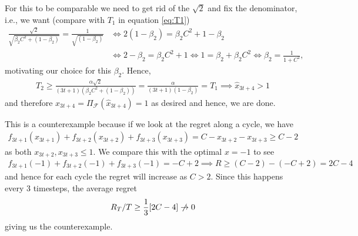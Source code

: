 \documentclass{article}
\newcommand{\1}{\mathbf{1}}                 %
\newcommand{\calF}{\mathcal{F}}
\newcommand{\pve}{\par\vspace{1cm}}
\begin{document}
For this to be comparable we need to get rid of the \(\sqrt{2}\) and fix the denominator, i.e., we want (compare with \(T_1\) in equation \eqref{eq:T1})
\begin{align}
\frac{\sqrt{2}}{\sqrt{\beta_2 C^2 + (1-\beta_2)}} = \frac{1}{\sqrt{(1-\beta_2)}} &\iff 2(1-\beta_2) = \beta_2 C^2 + 1 - \beta_2 \\ 
& \iff 2-\beta_2 = \beta_2 C^2 + 1 \iff 1 = \beta_2 + \beta_2 C^2 \iff \beta_2 = \frac{1}{1+C^2}, \label{eq:beta2}
\end{align}
motivating our choice for this \(\beta_2\). Hence, 
\begin{align*}
T_2 \geq \frac{\alpha\sqrt{2}}{(3t+1)(\beta_2 C^2 + (1-\beta_2))} = \frac{\alpha}{(3t+1)(1-\beta_2)} = T_1 \implies \hat{x}_{3t+4} > 1
\end{align*}
and therefore \(x_{3t+4}=\Pi_\calF(\hat{x}_{3t+4})=1\) as desired and hence, we are done. \pve 
This is a counterexample because if we look at the regret along a cycle, we have 
\begin{align*}
f_{3t+1}(x_{3t+1}) + f_{3t+2}(x_{3t+2}) + f_{3t+3}(x_{3t+3}) = C - x_{3t+2} - x_{3t+3} \geq C - 2
\end{align*}
as both \(x_{3t+2},x_{3t+3}\leq 1\). We compare this with the optimal \(x=-1\) to see 
\begin{align*}
    f_{3t+1}(-1) + f_{3t+2}(-1) + f_{3t+3}(-1) = -C + 2 \implies R \geq (C-2) - (-C+2) = 2C - 4
\end{align*}
and hence for each cycle the regret will increase as \(C>2\). Since this happens every 3 timesteps, the average regret 
\begin{align*}
R_T/T \geq \frac{1}{3} [2C-4] \centernot\to 0
\end{align*}
giving us the counterexample. 
\end{document}
